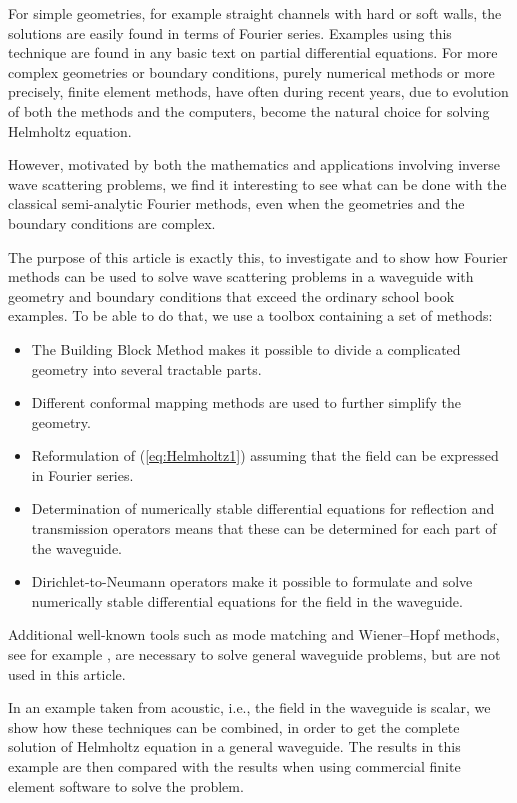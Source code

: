 \documentclass[numreferences]{kluwer}
\begin{document}
For simple geometries, for example straight channels with hard or soft
walls, the solutions are easily found in terms of Fourier
series. Examples using this technique are found in any basic text on
partial differential equations. For more complex geometries or
boundary conditions, purely numerical methods or more precisely,
finite element methods, have often during recent years, due to
evolution of both the methods and the computers, become the natural
choice for solving Helmholtz equation.

However, motivated by both the mathematics and applications involving
inverse wave scattering problems, we find it interesting to see what
can be done with the classical semi-analytic Fourier methods, even
when the geometries and the boundary conditions are complex.

The purpose of this article is exactly this, to investigate and to
show how Fourier methods can be used to solve wave scattering problems
in a waveguide with geometry and boundary conditions that exceed the
ordinary school book examples. To be able to do that, we use a toolbox
containing a set of methods:
\begin{itemize}
\item The Building Block Method makes it possible to divide a
  complicated geometry into several tractable parts.
\item Different conformal mapping methods are used to further simplify
  the geometry.
\item Reformulation of (\ref{eq:Helmholtz1}) assuming that the field
  can be expressed in Fourier series.
\item Determination of numerically stable differential equations for
  reflection and transmission operators means that these can be
  determined for each part of the waveguide.
\item Dirichlet-to-Neumann operators make it possible to formulate and
  solve numerically stable differential equations for the field in the
  waveguide.
\end{itemize}

Additional well-known tools such as mode matching and Wiener--Hopf
methods, see for example \cite{jones1986}, are necessary to solve
general waveguide problems, but are not used in this article.

In an example taken from acoustic, i.e., the field in the waveguide
is scalar, we show how these techniques can be combined, in order to
get the complete solution of Helmholtz equation in a general
waveguide. The results in this example are then compared with the
results when using commercial finite element software to solve the
problem.
\end{document}
